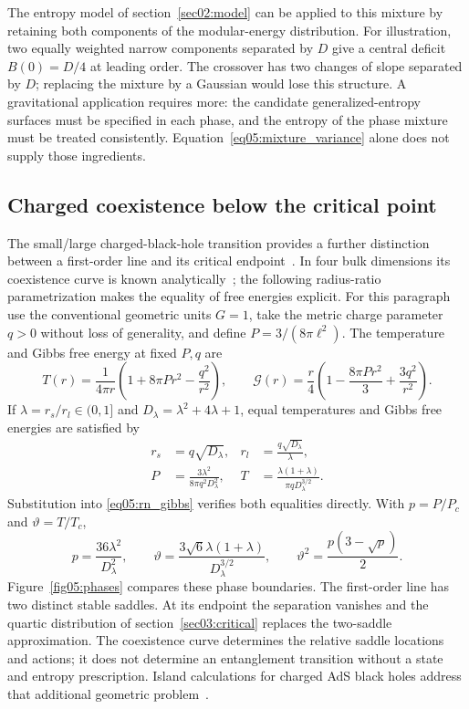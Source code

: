 \documentclass[11pt,letterpaper]{article}
\theoremstyle{plain}
\theoremstyle{definition}
\theoremstyle{remark}
\begin{document}
The entropy model of section~\ref{sec02:model} can be applied to this mixture by retaining both components of the modular-energy distribution. For illustration, two equally weighted narrow components separated by $D$ give a central deficit $B(0)=D/4$ at leading order. The crossover has two changes of slope separated by $D$; replacing the mixture by a Gaussian would lose this structure. A gravitational application requires more: the candidate generalized-entropy surfaces must be specified in each phase, and the entropy of the phase mixture must be treated consistently. Equation~\eqref{eq05:mixture_variance} alone does not supply those ingredients.

\subsection{Charged coexistence below the critical point}

The small/large charged-black-hole transition provides a further distinction between a first-order line and its critical endpoint~\cite{chamblin1999,kubiznakmann2012}. In four bulk dimensions its coexistence curve is known analytically~\cite{spallucci2013}; the following radius-ratio parametrization makes the equality of free energies explicit. For this paragraph use the conventional geometric units $G=1$, take the metric charge parameter $q>0$ without loss of generality, and define $P=3/(8\pi\ell^2)$. The temperature and Gibbs free energy at fixed $P,q$ are
\begin{equation}
 T(r)=\frac{1}{4\pi r}\left(1+8\pi Pr^2-\frac{q^2}{r^2}\right),
 \qquad
 \mathcal G(r)=\frac{r}{4}\left(1-\frac{8\pi Pr^2}{3}
 +\frac{3q^2}{r^2}\right).
 \label{eq05:rn_gibbs}
\end{equation}
If $\lambda=r_s/r_l\in(0,1]$ and $D_\lambda=\lambda^2+4\lambda+1$, equal temperatures and Gibbs free energies are satisfied by
\begin{align}
 r_s&=q\sqrt{D_\lambda}, & r_l&=\frac{q\sqrt{D_\lambda}}{\lambda},\nonumber\\
 P&=\frac{3\lambda^2}{8\pi q^2D_\lambda^2}, &
 T&=\frac{\lambda(1+\lambda)}{\pi qD_\lambda^{3/2}}.
 \label{eq05:rn_coexistence_parametric}
\end{align}
Substitution into \eqref{eq05:rn_gibbs} verifies both equalities directly. With $p=P/P_c$ and $\vartheta=T/T_c$,
\begin{equation}
 p=\frac{36\lambda^2}{D_\lambda^2},\qquad
 \vartheta=\frac{3\sqrt6\lambda(1+\lambda)}{D_\lambda^{3/2}},\qquad
 \vartheta^2=\frac{p(3-\sqrt p)}{2}.
 \label{eq05:rn_coexistence_reduced}
\end{equation}
Figure~\ref{fig05:phases} compares these phase boundaries. The first-order line has two distinct stable saddles. At its endpoint the separation vanishes and the quartic distribution of section~\ref{sec03:critical} replaces the two-saddle approximation. The coexistence curve determines the relative saddle locations and actions; it does not determine an entanglement transition without a state and entropy prescription. Island calculations for charged AdS black holes address that additional geometric problem~\cite{lin2024}.
\end{document}
